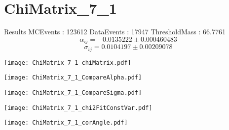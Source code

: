 \documentclass[a4paper,12pt]{article}
\begin{document}
\section{ChiMatrix\_7\_1}
\begin{minipage}{0.49\linewidth} Results \newline
MCEvents : 123612\newline
DataEvents : 17947 \newline
ThresholdMass : 66.7761\\
$$\alpha_{ij} = -0.0135222\pm 0.000460483$$
$$\sigma_{ij} = 0.0104197\pm 0.00209078$$
\end{minipage}\hfill
\begin{minipage}{0.49\linewidth} 
\texttt{[image: ChiMatrix\_7\_1\_chiMatrix.pdf]}\\
\end{minipage}
\hfill
\begin{minipage}{0.49\linewidth} 
\texttt{[image: ChiMatrix\_7\_1\_CompareAlpha.pdf]}\\
\end{minipage}
\hfill
\begin{minipage}{0.49\linewidth} 
\texttt{[image: ChiMatrix\_7\_1\_CompareSigma.pdf]}\\
\end{minipage}
\begin{minipage}{0.49\linewidth} 
\texttt{[image: ChiMatrix\_7\_1\_chi2FitConstVar.pdf]}\\
\end{minipage}
\hfill
\begin{minipage}{0.49\linewidth} 
\texttt{[image: ChiMatrix\_7\_1\_corAngle.pdf]}\\
\end{minipage}
\end{document}
